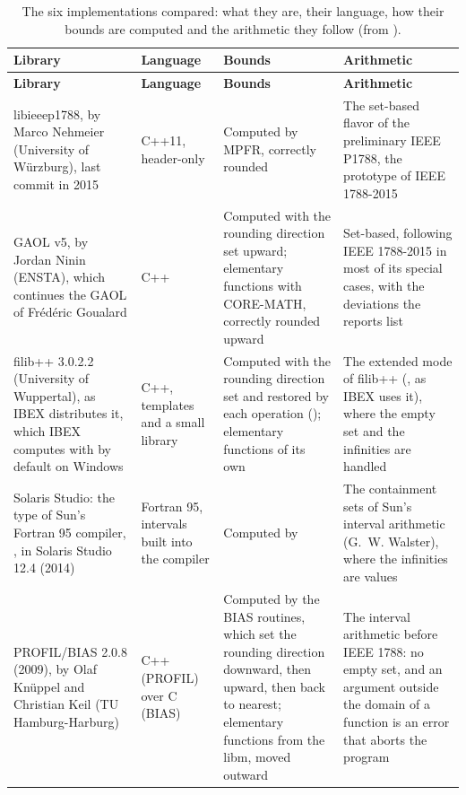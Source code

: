 \documentclass[12pt,a4paper,twoside,openright]{book}
\begin{document}
\begingroup\footnotesize
\begin{longtable}{|L{2.5cm}|L{1.9cm}|L{4.7cm}|L{4.0cm}|}
\caption[The six implementations compared]{The six implementations compared: what they are, their language,
how their bounds are computed and the arithmetic they follow (from
).}\label{tab:computing-libraries}\\
\hline
\textbf{Library} & \textbf{Language} & \textbf{Bounds}
& \textbf{Arithmetic} \\
\hline
\endfirsthead
\hline
\textbf{Library} & \textbf{Language} & \textbf{Bounds}
& \textbf{Arithmetic} \\
\hline
\endhead
\hline
\endfoot
\endlastfoot
libieeep1788, by Marco Nehmeier (University of W\"urzburg), last commit in
2015 & C++11, header-only & Computed by MPFR, correctly rounded & The
set-based flavor of the preliminary IEEE P1788, the prototype of IEEE
1788-2015 \\
\hline
GAOL v5, by Jordan Ninin (ENSTA), which continues the GAOL of Fr\'ed\'eric
Goualard & C++ & Computed with the rounding direction set upward; elementary
functions with CORE-MATH, correctly rounded upward & Set-based, following
IEEE 1788-2015 in most of its special cases, with the deviations the reports
list \\
\hline
filib++ 3.0.2.2 (University of Wuppertal), as IBEX distributes it, which
IBEX computes with by default on Windows & C++, templates and a small
library & Computed with the rounding direction set and restored by each
operation (); elementary functions of its own & The
extended mode of filib++ (, as IBEX uses it),
where the empty set and the infinities are handled \\
\hline
Solaris Studio: the  type of Sun's Fortran 95 compiler,
, in Solaris Studio 12.4 (2014) & Fortran 95, intervals built
into the compiler & Computed by  & The containment sets of
Sun's interval arithmetic (G.~W. Walster), where the infinities are
values \\
\hline
PROFIL/BIAS 2.0.8 (2009), by Olaf Kn\"uppel and Christian Keil (TU
Hamburg-Harburg) & C++ (PROFIL) over C (BIAS) & Computed by the BIAS
routines, which set the rounding direction downward, then upward, then back
to nearest; elementary functions from the libm, moved outward & The interval
arithmetic before IEEE 1788: no empty set, and an argument outside the
domain of a function is an error that aborts the program \\

\end{longtable}
\end{document}

